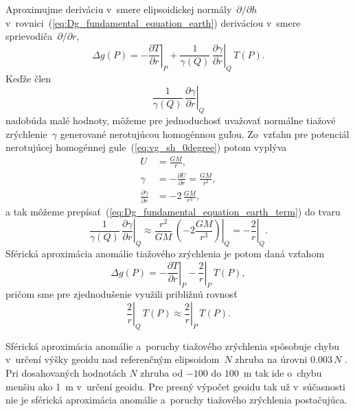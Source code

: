 \documentclass[a4paper,12pt]{book}
\begin{document}
Aproximujme deriváciu v~smere elipsoidickej normály~$\partial \slash \partial 
h$ v~rovnici~(\ref{eq:Dg_fundamental_equation_earth}) deriváciou v~smere 
sprievodiča~$\partial \slash \partial r$,
%
\begin{equation}
\Delta g(P) = -\left.\frac{\partial T}{\partial r}\right|_{P} 
+ \frac{1}{\gamma(Q)} \, \left.\frac{\partial \gamma}{\partial r}\right|_{Q} \, 
T(P){.}
\end{equation}
%
Keďže člen
%
\begin{equation}
\label{eq:Dg_fundamental_equation_earth_term}
\left.\frac{1}{\gamma(Q)} \, \frac{\partial \gamma}{\partial r}\right|_Q
\end{equation}
%
nadobúda malé hodnoty, môžeme pre jednoduchosť uvažovať normálne tiažové 
zrýchlenie~$\gamma$ generované nerotujúcou homogénnou guľou.  Zo~vzťahu pre 
potenciál nerotujúcej homogénnej gule~(\ref{eq:vg_sh_0degree}) potom vyplýva
%
\begin{align}
U &= \frac{GM}{r}{,}\\
%
\gamma &= -\frac{\partial U}{\partial r} = \frac{GM}{r^2}{,}\\
%
\frac{\partial \gamma}{\partial r} &= -2 \, \frac{GM}{r^3}{,}
\end{align}
%
a tak môžeme prepísať~(\ref{eq:Dg_fundamental_equation_earth_term}) do tvaru
%
\begin{equation}
\left.\frac{1}{\gamma(Q)} \, \frac{\partial \gamma}{\partial r}\right|_Q 
\approx \left.\frac{r^2}{GM} \, \left( -2\frac{GM}{r^3} \right)\right|_Q 
= -\left.\frac{2}{r}\right|_Q {.}
\end{equation}
%
Sférická aproximácia anomálie tiažového zrýchlenia je potom daná vzťahom
%
\begin{equation}
\label{eq:Dg_fundamental_equation_earth_sph}
\Delta g(P) = -\left.\frac{\partial T}{\partial r}\right|_{P} 
- \left.\frac{2}{r}\right|_{P} \, T(P){,}
\end{equation}
%
pričom sme pre zjednodušenie využili približnú rovnosť
%
\begin{equation}
\left.\frac{2}{r}\right|_Q \, T(P) \approx \left.\frac{2}{r}\right|_P \, 
T(P){.}
\end{equation}

Sférická aproximácia anomálie a~poruchy tiažového zrýchlenia spôsobuje chybu 
v~určení výšky geoidu nad referenčným elipsoidom~$N$ zhruba na úrovni $0.003 \, 
N$ \parencite{MoritzPhysicalGeodesy}.  Pri dosahovaných hodnotách $N$ zhruba od 
$-100$ do $100$~m tak ide o~chybu menšiu ako 1~m v~určení geoidu.  Pre presný 
výpočet geoidu tak už v~súčasnosti nie je sférická aproximácia anomálie 
a~poruchy tiažového zrýchlenia postačujúca.
\end{document}
